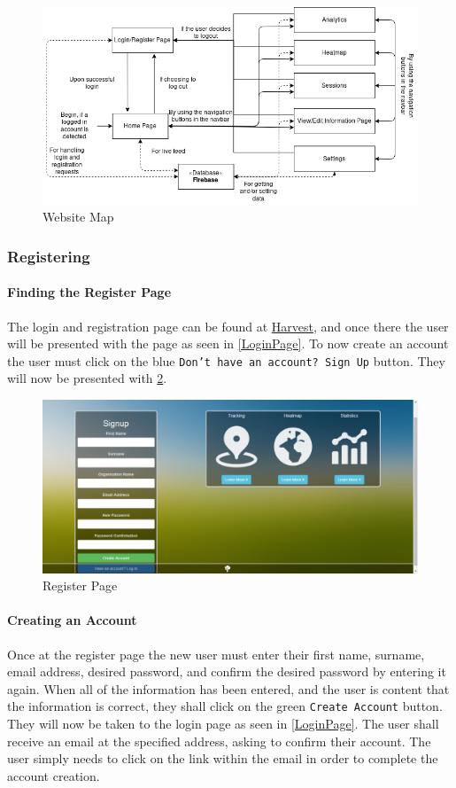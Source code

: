 \documentclass[11pt]{article}
\begin{document}
\begin{figure}[h]
 \centering
 \includegraphics[width=12cm, keepaspectratio]{Images/webDiagramMap.png}
 \caption{Website Map}
 \label{WebsiteMap}
\end{figure}

\subsubsection{Registering}
\paragraph{Finding the Register Page}The login and registration page can be found at \href{https://harvestapp.co.za}{Harvest}, and once there the user will be presented with the page as seen in \ref{LoginPage}. To now create an account the user must click on the blue \texttt{Don't have an account? Sign Up} button. They will now be presented with \ref{RegisterPage}.

\begin{figure}
 \centering
 \includegraphics[width=12cm, keepaspectratio]{Images/webRegister-Page.png}
 \caption{Register Page}
 \label{RegisterPage}
\end{figure}

\paragraph{Creating an Account}Once at the register page the new user must enter their first name, surname, email address, desired password, and confirm the desired password by entering it again. When all of the information has been entered, and the user is content that the information is correct, they shall click on the green \texttt{Create Account} button. They will now be taken to the login page as seen in \ref{LoginPage}. The user shall receive an email at the specified address, asking to confirm their account. The user simply needs to click on the link within the email in order to complete the account creation.
\end{document}
